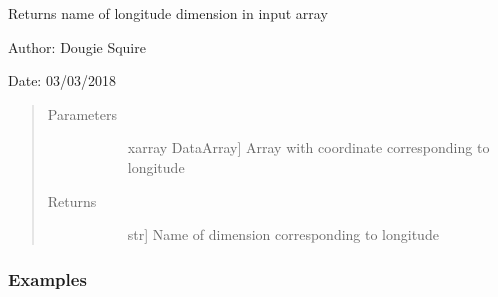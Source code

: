\documentclass[letterpaper,10pt,english]{sphinxmanual}
\begin{document}
\begin{fulllineitems}
\label{\detokenize{utils_doc:utils.get_lon_name}}
Returns name of longitude dimension in input array

\begin{DUlineblock}{0em}
\item[] Author: Dougie Squire
\item[] Date: 03/03/2018
\end{DUlineblock}
\begin{quote}\begin{description}
\item[{Parameters}] \leavevmode\begin{description}
\item[{}] \leavevmode{[}xarray DataArray{]}
Array with coordinate corresponding to longitude

\end{description}

\item[{Returns}] \leavevmode\begin{description}
\item[{}] \leavevmode{[}str{]}
Name of dimension corresponding to longitude

\end{description}

\end{description}\end{quote}
\subsubsection*{Examples}


\end{fulllineitems}
\end{document}
